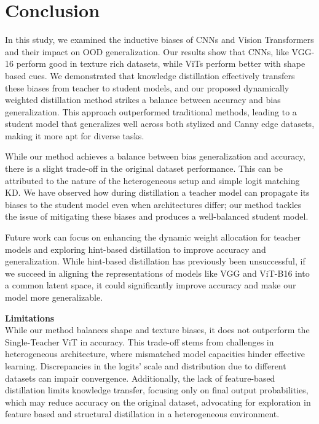 \documentclass{article}
\begin{document}
\section{Conclusion}
In this study, we examined the inductive biases of CNNs and Vision Transformers and their impact on OOD generalization. Our results show that CNNs, like VGG-16 perform good in texture rich datasets, while ViTs perform better with shape based cues. We demonstrated that knowledge distillation effectively transfers these biases from teacher to student models, and our proposed dynamically weighted distillation method strikes a balance between accuracy and bias generalization. This approach outperformed traditional methods, leading to a student model that generalizes well across both stylized and Canny edge datasets, making it more apt for diverse tasks.

While our method achieves a balance between bias generalization and accuracy, there is a slight trade-off in the original dataset performance. This can be attributed to the nature of the heterogeneous setup and simple logit matching KD. We have observed how during distillation a teacher model can propagate its biases to the student model even when architectures differ; our method tackles the issue of mitigating these biases and produces a well-balanced student model.

Future work can focus on enhancing the dynamic weight allocation for teacher models and exploring hint-based distillation to improve accuracy and generalization. While hint-based distillation has previously been unsuccessful, if we succeed in aligning the representations of models like VGG and ViT-B16 into a common latent space, it could significantly improve accuracy and make our model more generalizable.

\textbf{Limitations}\\
While our method balances shape and texture biases, it does not outperform the Single-Teacher ViT in accuracy. This trade-off stems from challenges in heterogeneous architecture, where mismatched model capacities hinder effective learning. Discrepancies in the logits' scale and distribution due to different datasets can impair convergence. Additionally, the lack of feature-based distillation limits knowledge transfer, focusing only on final output probabilities, which may reduce accuracy on the original dataset, advocating for exploration in feature based and structural distillation in a heterogeneous environment.








\end{document}

